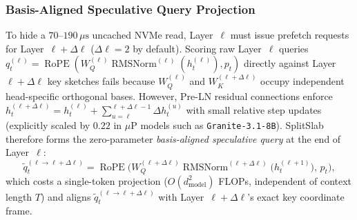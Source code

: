 \documentclass[final,5p,times,twocolumn]{elsarticle}
\theoremstyle{definition}
\theoremstyle{remark}
\newcommand{\SplitSlab}{\textup{\textsc{SplitSlab}}}
\newcommand{\RMSNorm}{\operatorname{RMSNorm}}
\newcommand{\RoPE}{\operatorname{RoPE}}
\def\SplitSlab{SplitSlab}%
\begin{document}
\subsubsection{Basis-Aligned Speculative Query Projection}
To hide a $70$--$190\,\mu\mathrm{s}$ uncached NVMe read, Layer~$\ell$ must issue prefetch requests for Layer~$\ell + \Delta\ell$ ($\Delta\ell = 2$ by default). Scoring raw Layer~$\ell$ queries $q_t^{(\ell)} = \RoPE(W_Q^{(\ell)}\RMSNorm^{(\ell)}(h_t^{(\ell)}), p_t)$ directly against Layer~$\ell+\Delta\ell$ key sketches fails because $W_Q^{(\ell)}$ and $W_K^{(\ell+\Delta\ell)}$ occupy independent head-specific orthogonal bases. However, Pre-LN residual connections enforce $h_t^{(\ell+\Delta\ell)} = h_t^{(\ell)} + \sum_{u=\ell}^{\ell+\Delta\ell-1} \Delta h_t^{(u)}$ with small relative step updates (explicitly scaled by $0.22$ in $\mu\text{P}$ models such as \texttt{Granite-3.1-8B}). \SplitSlab{} therefore forms the zero-parameter \emph{basis-aligned speculative query} at the end of Layer~$\ell$:
\begin{equation}\label{eq:spec_query}
\tilde{q}_t^{(\ell \to \ell+\Delta\ell)} = \RoPE\!\Big(W_Q^{(\ell+\Delta\ell)} \RMSNorm^{(\ell+\Delta\ell)}\!\big(h_t^{(\ell+1)}\big),\, p_t\Big),
\end{equation}
which costs a single-token projection ($O(d_{\mathrm{model}}^2)$ FLOPs, independent of context length $T$) and aligns $\tilde{q}_t^{(\ell \to \ell+\Delta\ell)}$ with Layer~$\ell+\Delta\ell$'s exact key coordinate frame.
\end{document}
